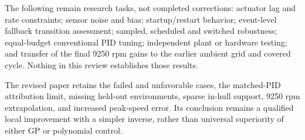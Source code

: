 \documentclass[11pt,a4paper]{article}
\begin{document}
The following remain research tasks, not completed corrections: actuator lag and rate constraints; sensor noise and bias; startup/restart behavior; event-level fallback transition assessment; sampled, scheduled and switched robustness; equal-budget conventional PID tuning; independent plant or hardware testing; and transfer of the final 9250 rpm gains to the earlier ambient grid and covered cycle. Nothing in this review establishes those results.

The revised paper retains the failed and unfavorable cases, the matched-PID attribution limit, missing held-out environments, sparse in-hull support, 9250 rpm extrapolation, and increased peak-speed error. Its conclusion remains a qualified local improvement with a simpler inverse, rather than universal superiority of either GP or polynomial control.
\end{document}
